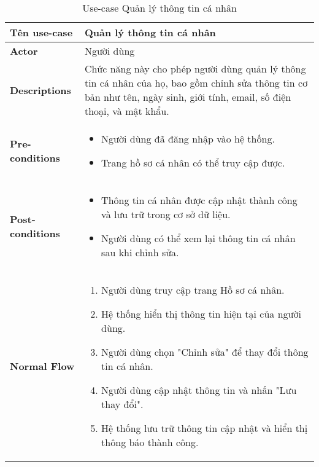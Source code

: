 \begin{longtable}[H]{|l|p{}|}
    \caption{Use-case Quản lý thông tin cá nhân}
    \\ \hline
    \textbf{Tên use-case} & Quản lý thông tin cá nhân\\
    \hline
    \textbf{Actor} & Người dùng \\
    \hline
    \textbf{Descriptions} & Chức năng này cho phép người dùng quản lý thông tin cá nhân của họ, bao gồm chỉnh sửa thông tin cơ bản như tên, ngày sinh, giới tính, email, số điện thoại, và mật khẩu. \\
    \hline
    \textbf{Pre-conditions} & \vspace{-0.75cm} \begin{itemize}[leftmargin=4mm]
        \setlength\itemsep{0em}
        \item Người dùng đã đăng nhập vào hệ thống.
        \item Trang hồ sơ cá nhân có thể truy cập được.
    \end{itemize} \\
    
    \hline

    \textbf{Post-conditions} & \vspace{-0.75cm} \begin{itemize}[leftmargin=4mm]
        \setlength\itemsep{0em}
        \item Thông tin cá nhân được cập nhật thành công và lưu trữ trong cơ sở dữ liệu.
        \item Người dùng có thể xem lại thông tin cá nhân sau khi chỉnh sửa.
    \end{itemize} \\
        
    \hline
    \textbf{Normal Flow} & \vspace{-0.75cm}
        \begin{enumerate}[leftmargin=5.5mm]
            \setlength\itemsep{0em}
            \item Người dùng truy cập trang Hồ sơ cá nhân.
            \item Hệ thống hiển thị thông tin hiện tại của người dùng.
            \item Người dùng chọn "Chỉnh sửa" để thay đổi thông tin cá nhân.
            \item Người dùng cập nhật thông tin và nhấn "Lưu thay đổi".
            \item Hệ thống lưu trữ thông tin cập nhật và hiển thị thông báo thành công.
        \end{enumerate}\\
        

\end{longtable}
